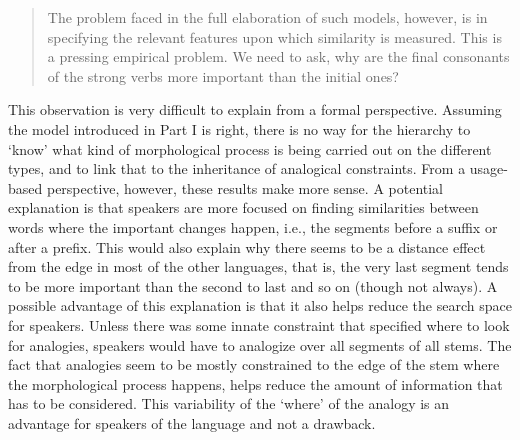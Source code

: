 \begin{quotation}
  The problem faced in the full elaboration of such models, however, is in specifying the relevant features upon which similarity is measured. This is a pressing empirical problem. We need to ask, why are the final consonants of the strong verbs more important than the initial ones? \autocite[62]{Bybee.2010}
\end{quotation}

\noindent
This observation is very difficult to explain from a formal perspective. Assuming the model introduced in Part I is right, there is no way for the hierarchy to `know' what kind of morphological process is being carried out on the different types, and to link that to the inheritance of analogical constraints. From a usage-based perspective, however, these results make more sense. A potential explanation is that speakers are more focused on finding similarities between words where the important changes happen, i.e., the segments before a suffix or after a prefix. This would also explain why there seems to be a distance effect from the edge in most of the other languages, that is, the very last segment tends to be more important than the second to last and so on (though not always). A possible advantage of this explanation is that it also helps reduce the search space for speakers. Unless there was some innate constraint that specified where to look for analogies, speakers would have to analogize over all segments of all stems. The fact that analogies seem to be mostly constrained to the edge of the stem where the morphological process happens, helps reduce the amount of information that has to be considered. This variability of the `where' of the analogy is an advantage for speakers of the language and not a drawback.


